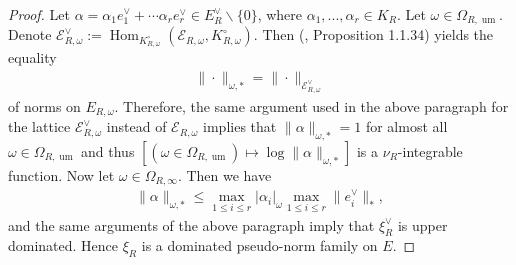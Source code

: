 \documentclass [11pt,reqno]{amsart}
\newcommand{\1}{\mathmybb{1}}
\def\cE{{\mathcal{E}}}
\def\Hom{\operatorname{Hom}}
\def\um{\operatorname{um}}
\def\setminus{\smallsetminus}
\begin{document}
\begin{proof}
Let $\alpha=\alpha_1e_1^{\vee} + \cdots \alpha_{r}e^{\vee}_{r}\in E_R^{\vee} \setminus\{0\}$, where $\alpha_1,...,\alpha_r\in K_R$. Let $\omega\in \Omega_{R,\um}$. Denote $\cE_{R,\omega}^{\vee}:= \Hom_{K_{R,\omega}^{\circ}}(\cE_{R,\omega},K_{R,\omega}^{\circ})$. Then (\cite{ChenMori}, Proposition 1.1.34) yields the equality 
\begin{align*}
\|\cdot\|_{\omega,\ast} = \|\cdot\|_{\cE_{R,\omega}^{\vee}}
\end{align*}
of norms on $E_{R,\omega}$. Therefore, the same argument used in the above paragraph for the lattice $\cE^{\vee}_{R,\omega}$ instead of $\cE_{R,\omega}$ implies that $\|\alpha\|_{\omega,\ast} = 1$ for almost all $\omega\in\Omega_{R,\um}$ and thus $[(\omega\in \Omega_{R,\um}) \mapsto \log\|\alpha\|_{\omega,\ast}]$ is a $\nu_R$-integrable function. Now let $\omega\in \Omega_{R,\infty}$. Then we have 
\begin{align*}
\|\alpha\|_{\omega,\ast} \leq \displaystyle\max_{1\leq i \leq r} |\alpha_i|_{\omega} \max_{1\leq i \leq r} \|e^{\vee}_i\|_{\ast},
\end{align*}
and the same arguments of the above paragraph imply that $\xi_R^{\vee}$ is upper dominated. Hence $\xi_R$ is a dominated pseudo-norm family on $E$. 


\end{proof}
\end{document}
